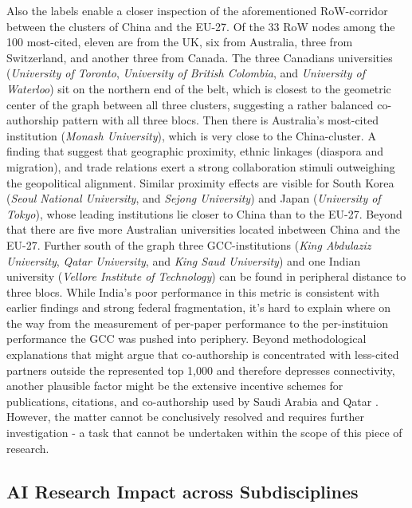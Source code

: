\documentclass{article}
\begin{document}
	Also the labels enable a closer inspection of the aforementioned RoW-corridor between the clusters of China and the EU-27. Of the 33 RoW nodes among the 100 most-cited, eleven are from the UK, six from Australia, three from Switzerland, and another three from Canada. The three Canadians universities (\textit{University of Toronto}, \textit{University of British Colombia}, and \textit{University of Waterloo}) sit on the northern end of the belt, which is closest to the geometric center of the graph between all three clusters, suggesting a rather balanced co-authorship pattern with all three blocs. Then there is Australia's most-cited institution (\textit{Monash University}), which is very close to the China-cluster. A finding that suggest that geographic proximity, ethnic linkages (diaspora and migration), and trade relations exert a strong collaboration stimuli outweighing the geopolitical alignment. Similar proximity effects are visible for South Korea (\textit{Seoul National University}, and \textit{Sejong University}) and Japan (\textit{University of Tokyo}), whose leading institutions lie closer to China than to the EU-27. Beyond that there are five more Australian universities located inbetween China and the EU-27. Further south of the graph three GCC-institutions (\textit{King Abdulaziz University}, \textit{Qatar University}, and \textit{King Saud University}) and one Indian university (\textit{Vellore Institute of Technology}) can be found in peripheral distance to three blocs. While India's poor performance in this metric is consistent with earlier findings and strong federal fragmentation, it's hard to explain where on the way from the measurement of per-paper performance to the per-instituion performance the GCC was pushed into periphery. Beyond methodological explanations that might argue that co-authorship is concentrated with less-cited partners outside the represented top 1,000 and therefore depresses connectivity, another plausible factor might be the extensive incentive schemes for publications, citations, and co-authorship used by Saudi Arabia and Qatar \cite{Boufarss2020OpenSesame}. However, the matter cannot be conclusively resolved and requires further investigation - a task that cannot be undertaken within the scope of this piece of research.
	
	
	\subsection{AI Research Impact across Subdisciplines}
	\label{impact_across_subdisciplines}
	
\end{document}
